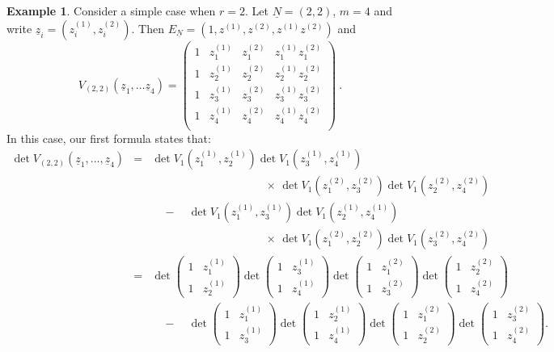 \documentclass[10pt]{amsart}
\theoremstyle{definition}
\newtheorem{example}[thm]{Example}
\theoremstyle{remark}
\numberwithin{equation}{section}
\newcommand{\z}{\underline{z}}
\newcommand{\0}{\color{blue}{\mathsf{0}}}
\begin{document}
\begin{example} \label{intro: example22}
Consider a simple case when $r=2$.  Let  $\underline{N}=(2,2)$, $m=4$  and write $\z_i= (z_i^{(1)}, z_i^{(2)})$. Then $E_{\underline{N}} = ( 1, z^{(1)}, z^{(2)}, z^{(1)} z^{(2)})$ and  
\[V_{(2,2)}(\z_1,\ldots \z_4)= \begin{pmatrix} 1 & z^{(1)}_1 & z^{(2)}_1 & z^{(1)}_1 z^{(2)}_1 \nonumber\\ 
1 & z^{(1)}_2 & z^{(2)}_2 & z^{(1)}_2 z^{(2)}_2  \nonumber\\ 
1 & z^{(1)}_3 & z^{(2)}_3 & z^{(1)}_3 z^{(2)}_3  \nonumber\\ 
1 & z^{(1)}_4 & z^{(2)}_4 & z^{(1)}_4 z^{(2)}_4  \nonumber\\ 
\end{pmatrix}  \  .
\]
In this case, our first formula states that: 
\begin{eqnarray}  \det V_{(2,2)}(\z_1,\ldots, \z_4)  &=&   \det V_1(z^{(1)}_1,z^{(1)}_2) \det V_1(z^{(1)}_3,z^{(1)}_4)  \nonumber  \\
&& \qquad \qquad \qquad \qquad \qquad \times \,   \det V_1(z^{(2)}_1,z^{(2)}_3)  \det V_1(z^{(2)}_2,z^{(2)}_4) \nonumber \\
&&\quad  - \quad     \det V_1(z^{(1)}_1,z^{(1)}_3) \det V_1(z^{(1)}_2,z^{(1)}_4)  \nonumber \\
&& \qquad \qquad \qquad \qquad \qquad \times \,    \det V_1(z^{(2)}_1,z^{(2)}_2) \det V_1(z^{(2)}_3,z^{(2)}_4)  \nonumber\\
& = & \det \begin{pmatrix} 1   &  z^{(1)}_1  \\ 1 & z^{(1)}_2  \end{pmatrix}\det \begin{pmatrix} 1   &  z^{(1)}_3  \\ 1 & z^{(1)}_4  \end{pmatrix}   \det \begin{pmatrix} 1   &  z^{(2)}_1  \\ 1 & z^{(2)}_3  \end{pmatrix} \det \begin{pmatrix} 1   &  z^{(2)}_2  \\ 1 & z^{(2)}_4  \end{pmatrix} \nonumber \\ 
 &&  \quad  - \quad      \det \begin{pmatrix} 1   &  z^{(1)}_1  \\ 1 & z^{(1)}_3  \end{pmatrix}\det \begin{pmatrix} 1   &  z^{(1)}_2  \\ 1 & z^{(1)}_4  \end{pmatrix}  \det \begin{pmatrix} 1   &  z^{(2)}_1  \\ 1 & z^{(2)}_2  \end{pmatrix} \det \begin{pmatrix} 1   &  z^{(2)}_3  \\ 1 & z^{(2)}_4  \end{pmatrix} \nonumber .

\end{eqnarray}
\end{example}
\end{document}
